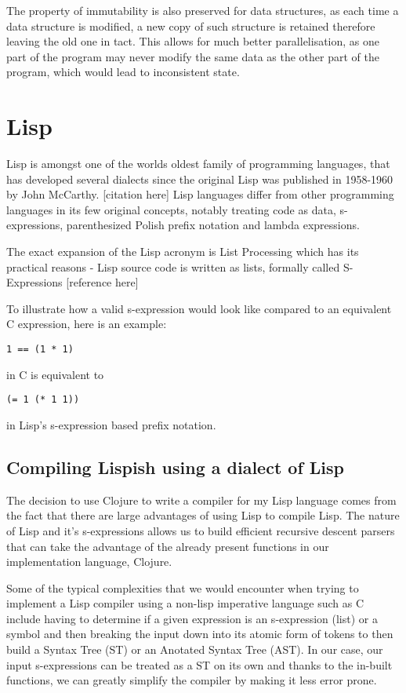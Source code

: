 The property of immutability is also preserved for data structures, as each time a data structure is modified, a new copy of such structure is retained therefore leaving the old one in tact. This allows for much better parallelisation, as one part of the program may never modify the same data as the other part of the program, which would lead to inconsistent state.

\section{Lisp}
Lisp is amongst one of the worlds oldest family of programming languages, that has developed several dialects since the original Lisp was published in 1958-1960 by John McCarthy. [citation here]
Lisp languages differ from other programming languages in its few original concepts, notably treating code as data, s-expressions, parenthesized Polish prefix notation and lambda expressions.

The exact expansion of the Lisp acronym is List Processing which has its practical reasons - Lisp source code is written as lists, formally called S-Expressions [reference here]

To illustrate how a valid s-expression would look like compared to an equivalent C expression, here is an example:

\begin{lstlisting}
1 == (1 * 1)
\end{lstlisting}
in C is equivalent to

\begin{lstlisting}
(= 1 (* 1 1))
\end{lstlisting}
in Lisp's s-expression based prefix notation.


\subsection{Compiling Lispish using a dialect of Lisp}
The decision to use Clojure to write a compiler for my Lisp language comes from the fact that there are large advantages of using Lisp to compile Lisp.
The nature of Lisp and it's s-expressions allows us to build efficient recursive descent parsers that can take the advantage of the already present functions in our implementation language, Clojure.

Some of the typical complexities that we would encounter when trying to implement a Lisp compiler using a non-lisp imperative language such as C include having to determine if a given expression is an s-expression (list) or a symbol and then breaking the input down into its atomic form of tokens to then build a Syntax Tree (ST) or an Anotated Syntax Tree (AST).
In our case, our input s-expressions can be treated as a ST on its own and thanks to the in-built functions, we can greatly simplify the compiler by making it less error prone.


